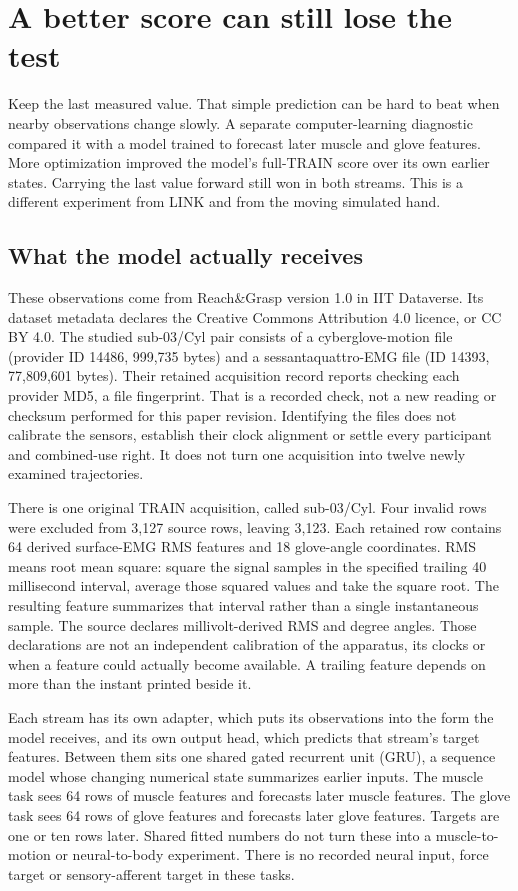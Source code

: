 \section{A better score can still lose the test}
\label{sec:self-forecast}

Keep the last measured value. That simple prediction can be hard to beat when nearby observations change slowly. A separate computer-learning diagnostic compared it with a model trained to forecast later muscle and glove features. More optimization improved the model's full-TRAIN score over its own earlier states. Carrying the last value forward still won in both streams. This is a different experiment from LINK and from the moving simulated hand.\cite{movementTrain990Recorded2026}

\subsection{What the model actually receives}
These observations come from Reach\&Grasp version 1.0 in IIT Dataverse. Its dataset metadata declares the Creative Commons Attribution 4.0 licence, or CC BY 4.0.\cite{reachGraspV1} The studied sub-03/Cyl pair consists of a cyberglove-motion file (provider ID 14486, 999,735 bytes) and a sessantaquattro-EMG file (ID 14393, 77,809,601 bytes). Their retained acquisition record reports checking each provider MD5, a file fingerprint. That is a recorded check, not a new reading or checksum performed for this paper revision. Identifying the files does not calibrate the sensors, establish their clock alignment or settle every participant and combined-use right. It does not turn one acquisition into twelve newly examined trajectories.

There is one original TRAIN acquisition, called sub-03/Cyl. Four invalid rows were excluded from 3,127 source rows, leaving 3,123. Each retained row contains 64 derived surface-EMG RMS features and 18 glove-angle coordinates. RMS means root mean square: square the signal samples in the specified trailing 40 millisecond interval, average those squared values and take the square root. The resulting feature summarizes that interval rather than a single instantaneous sample. The source declares millivolt-derived RMS and degree angles. Those declarations are not an independent calibration of the apparatus, its clocks or when a feature could actually become available. A trailing feature depends on more than the instant printed beside it.

Each stream has its own adapter, which puts its observations into the form the model receives, and its own output head, which predicts that stream's target features. Between them sits one shared gated recurrent unit (GRU), a sequence model whose changing numerical state summarizes earlier inputs. The muscle task sees 64 rows of muscle features and forecasts later muscle features. The glove task sees 64 rows of glove features and forecasts later glove features. Targets are one or ten rows later. Shared fitted numbers do not turn these into a muscle-to-motion or neural-to-body experiment. There is no recorded neural input, force target or sensory-afferent target in these tasks.

